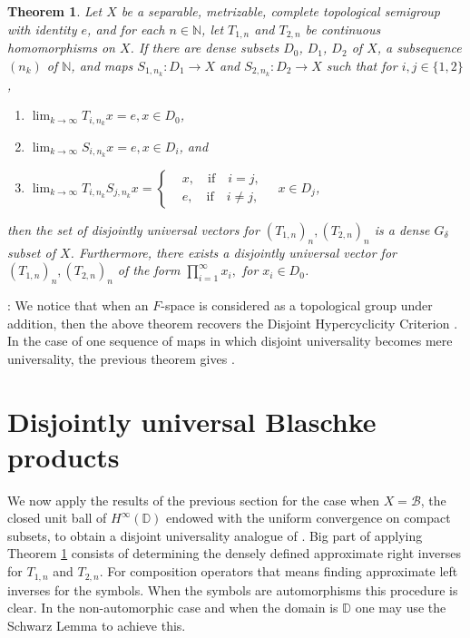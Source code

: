 \documentclass[12pt,a4paper]{amsart}
\theoremstyle{plain}
\newtheorem{theorem}{Theorem}[section]
\theoremstyle{definition}
\theoremstyle{remark}
\theoremstyle{fact}
\newenvironment{rem}
{ \noindent {\it Remark\/}: }
{\null \hfill \par\medskip}
\begin{document}
\begin{theorem} \label{criterion}
    Let $X$ be a separable, metrizable, complete topological semigroup with identity $e$, and for each $n\in \mathbb{N}$, let $T_{1,n}$ and $T_{2,n}$  be continuous homomorphisms on $X$. If there are dense subsets $D_0$, $D_1$, $D_2$ of $X$, a subsequence $(n_k)$ of $\mathbb{N}$, and maps $S_{1, n_k}: D_1\rightarrow X$ and $S_{2, n_k}:D_2\rightarrow X$ such that for $i,j\in \{1,2\}$,
    \begin{enumerate}
        \item $\lim_{k\rightarrow \infty}T_{i, n_k} x=e, x \in D_0$,
        \item $\lim_{k\rightarrow \infty}S_{i, n_k} x=e, x \in D_i$, and
        \item $\lim_{k\rightarrow \infty}T_{i, n_k}S_{j, n_k} x=\begin{cases}&x, \quad \text{if} \quad i=j,\\
        &e, \quad \text{if} \quad i\neq j, \end{cases}  \quad x \in D_j$,
    \end{enumerate}
    then the set of disjointly universal vectors for $(T_{1,n})_n, (T_{2,n})_n$ is a dense $G_{\delta}$ subset of $X$. Furthermore, there exists a disjointly universal vector for $(T_{1,n})_n, (T_{2,n})_n$ of the form
    $
    \prod_{i=1}^{\infty}x_i,
    $
    for $x_i \in D_0$.
\end{theorem}



   \begin{rem}
        We notice that when an $F$-space is considered as a topological group under addition, then the above theorem recovers the Disjoint Hypercyclicity Criterion \cite[Proposition 2.5]{BP07}. In the case of one sequence of maps in which disjoint universality becomes mere universality, the previous theorem gives \cite[Corollary 2.2]{Dave}.
    \end{rem}
    
    
\section{Disjointly universal Blaschke products}    
    

    We now apply the results of the previous section for the case when $X=\mathcal{B}$, the closed unit ball of $H^{\infty}(\mathbb{D})$ endowed with the uniform convergence on compact subsets, to obtain a disjoint universality analogue of \cite[Theorem 2.1]{BGGM09}. Big part of applying Theorem \ref{criterion} consists of determining the densely defined approximate right inverses for $T_{1, n}$ and $T_{2, n}$. For composition operators that means finding approximate left inverses for the symbols. When the symbols are automorphisms this procedure is clear. In the non-automorphic case and when the domain is $\mathbb{D}$ one may use the Schwarz Lemma to achieve this. 
    
\end{document}
